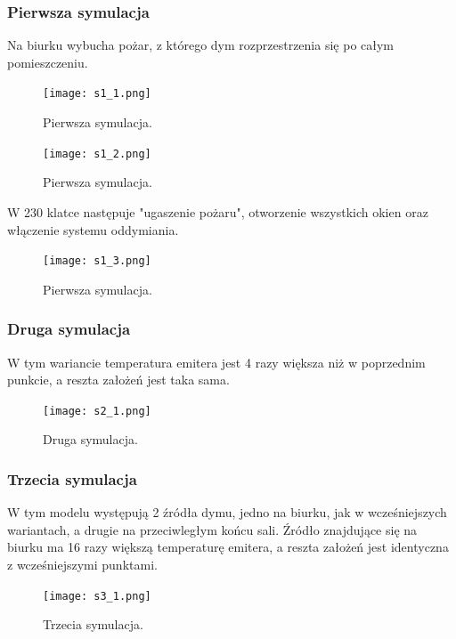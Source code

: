 \documentclass{article}
\begin{document}
        \subsubsection{Pierwsza symulacja}
        Na biurku wybucha pożar, z którego dym rozprzestrzenia się po całym pomieszczeniu.
        
        \begin{figure}[ht!]
            \centering
            \texttt{[image: s1\_1.png]}
            \caption{Pierwsza symulacja.}
        \end{figure}
        
        \begin{figure}[ht!]
            \centering
            \texttt{[image: s1\_2.png]}
            \caption{Pierwsza symulacja.}
        \end{figure}
        
        \newpage
        W 230 klatce następuje "ugaszenie pożaru", otworzenie wszystkich okien oraz włączenie systemu oddymiania.
        
        \begin{figure}[ht!]
            \centering
            \texttt{[image: s1\_3.png]}
            \caption{Pierwsza symulacja.}
        \end{figure}
        
        \subsubsection{Druga symulacja}
        W tym wariancie temperatura emitera jest 4 razy większa niż w poprzednim punkcie, a reszta założeń jest taka sama.
        \begin{figure}[ht!]
                \centering
                \texttt{[image: s2\_1.png]}
                \caption{Druga symulacja.}
        \end{figure}
        
        \newpage
        \subsubsection{Trzecia symulacja}
        W tym modelu występują 2 źródła dymu, jedno na biurku, jak w wcześniejszych wariantach, a drugie na przeciwległym końcu sali. Źródło znajdujące się na biurku ma 16 razy większą temperaturę emitera, a reszta założeń jest identyczna z wcześniejszymi punktami.
        
        \begin{figure}[ht!]
            \centering
            \texttt{[image: s3\_1.png]}
            \caption{Trzecia symulacja.}
        \end{figure}
        
\end{document}
